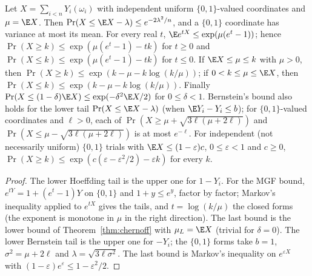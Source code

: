 \begin{theorem}\label{thm:chernoffmgf}
\leanok{}
Let $X=\sum_{i<n}Y_i(\omega_i)$ with independent uniform $\{0,1\}$-valued
coordinates and $\mu=\E X$. Then $\Pr(X\le\E X-\lambda)\le e^{-2\lambda^2/n}$, and a
$\{0,1\}$ coordinate has variance at most its mean. For every real $t$,
$\E e^{tX}\le\exp(\mu(e^t-1))$; hence $\Pr(X\ge k)\le\exp(\mu(e^t-1)-tk)$ for
$t\ge0$ and $\Pr(X\le k)\le\exp(\mu(e^t-1)-tk)$ for $t\le0$. If $\E X\le\mu\le k$
with $\mu>0$, then $\Pr(X\ge k)\le\exp(k-\mu-k\log(k/\mu))$; if $0<k\le\mu\le\E X$,
then $\Pr(X\le k)\le\exp(k-\mu-k\log(k/\mu))$. Finally
$\Pr(X\le(1-\delta)\E X)\le\exp(-\delta^2\E X/2)$ for $0\le\delta<1$.
Bernstein's bound also holds for the lower tail $\Pr(X\le\E X-\lambda)$ (when
$\E Y_i-Y_i\le b$); for $\{0,1\}$-valued coordinates and $\ell>0$, each of
$\Pr(X\ge\mu+\sqrt{3\ell(\mu+2\ell)})$ and $\Pr(X\le\mu-\sqrt{3\ell(\mu+2\ell)})$ is at
most $e^{-\ell}$. For independent (not necessarily uniform) $\{0,1\}$ trials with
$\E X\le(1-\varepsilon)c$, $0\le\varepsilon<1$ and $c\ge0$,
$\Pr(X\ge k)\le\exp(c(\varepsilon-\varepsilon^2/2)-\varepsilon k)$ for every $k$.
\end{theorem}
\begin{proof}\leanok
The lower Hoeffding tail is the upper one for $1-Y_i$. For the MGF bound,
$e^{tY}=1+(e^t-1)Y$ on $\{0,1\}$ and $1+y\le e^y$, factor by factor; Markov's
inequality applied to $e^{tX}$ gives the tails, and $t=\log(k/\mu)$ the closed forms
(the exponent is monotone in $\mu$ in the right direction). The last bound is the
lower bound of Theorem~\ref{thm:chernoff} with $\mu_L=\E X$ (trivial for $\delta=0$).
The lower Bernstein tail is the upper one for $-Y_i$; the $\{0,1\}$ forms take $b=1$,
$\sigma^2=\mu+2\ell$ and $\lambda=\sqrt{3\ell\sigma^2}$. The last bound is Markov's
inequality on $e^{\varepsilon X}$ with $(1-\varepsilon)e^{\varepsilon}\le1-\varepsilon^2/2$.
\end{proof}
